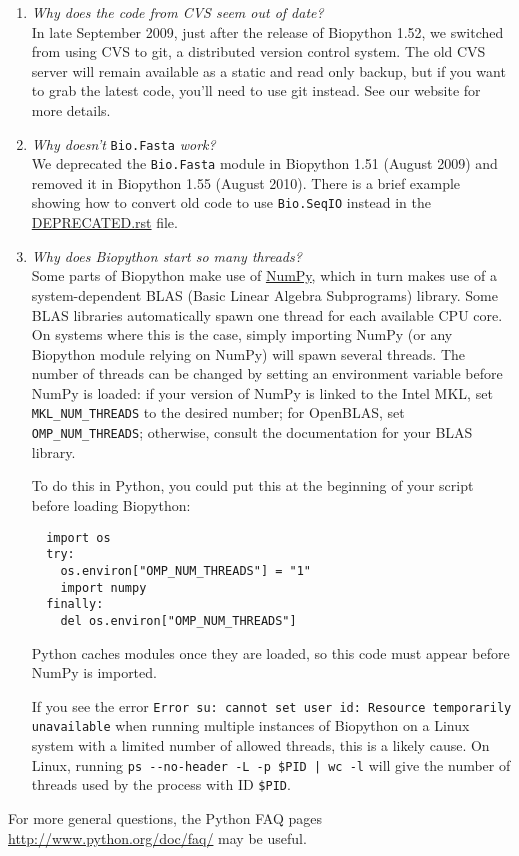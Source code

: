 \begin{enumerate}
 \item \emph{Why does the code from CVS seem out of date?} \\
  In late September 2009, just after the release of Biopython 1.52, we switched from using CVS to git, a distributed version control system. The old CVS server will remain available as a static and read only backup, but if you want to grab the latest code, you'll need to use git instead. See our website for more details.

  \item \emph{Why doesn't} \verb|Bio.Fasta| \emph{work?} \\
  We deprecated the \verb|Bio.Fasta| module in Biopython 1.51 (August 2009) and removed it in Biopython 1.55 (August 2010). There is a brief example showing how to convert old code to use \verb|Bio.SeqIO| instead in the \href{https://github.com/biopython/biopython/blob/master/DEPRECATED.rst}{DEPRECATED.rst} file.

  \item \emph{Why does Biopython start so many threads?} \\
  Some parts of Biopython make use of \href{http://www.numpy.org}{NumPy}, which in turn makes use of a system-dependent BLAS (Basic Linear Algebra Subprograms) library. Some BLAS libraries automatically spawn one thread for each available CPU core. On systems where this is the case, simply importing NumPy (or any Biopython module relying on NumPy) will spawn several threads. The number of threads can be changed by setting an environment variable before NumPy is loaded: if your version of NumPy is linked to the Intel MKL, set \verb|MKL_NUM_THREADS| to the desired number; for OpenBLAS, set \verb|OMP_NUM_THREADS|; otherwise, consult the documentation for your BLAS library.

  To do this in Python, you could put this at the beginning of your script before loading Biopython:
  \begin{verbatim}
  import os
  try:
    os.environ["OMP_NUM_THREADS"] = "1"
    import numpy
  finally:
    del os.environ["OMP_NUM_THREADS"]
  \end{verbatim}
  Python caches modules once they are loaded, so this code must appear before NumPy is imported.

  If you see the error \verb|Error su: cannot set user id: Resource temporarily unavailable| when running multiple instances of Biopython on a Linux system with a limited number of allowed threads, this is a likely cause. On Linux, running \verb!ps --no-header -L -p $PID | wc -l! will give the number of threads used by the process with ID \verb|$PID|.


\end{enumerate}

\noindent For more general questions, the Python FAQ pages \url{http://www.python.org/doc/faq/} may be useful.

